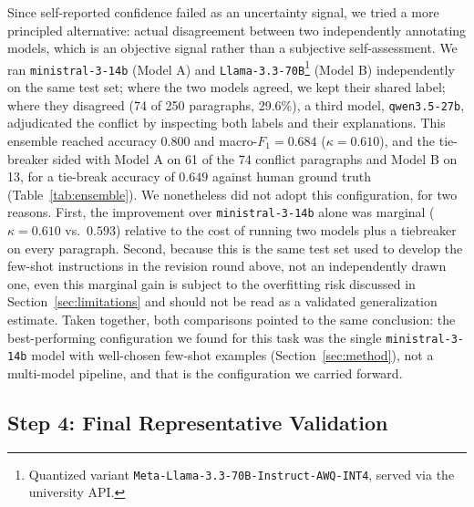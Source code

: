 \documentclass[a4paper,oneside,bibliography=totoc]{scrartcl}
\begin{document}
Since self-reported confidence failed as an uncertainty signal, we tried a more principled alternative: actual disagreement between two independently annotating models, which is an objective signal rather than a subjective self-assessment. We ran \texttt{ministral-3-14b} (Model A) and \texttt{Llama-3.3-70B}\footnote{Quantized variant \texttt{Meta-Llama-3.3-70B-Instruct-AWQ-INT4}, served via the university API.} (Model B) independently on the same test set; where the two models agreed, we kept their shared label; where they disagreed (74 of 250 paragraphs, 29.6\%), a third model, \texttt{qwen3.5-27b}, adjudicated the conflict by inspecting both labels and their explanations. This ensemble reached accuracy $0.800$ and macro-$F_1 = 0.684$ ($\kappa = 0.610$), and the tie-breaker sided with Model A on 61 of the 74 conflict paragraphs and Model B on 13, for a tie-break accuracy of $0.649$ against human ground truth (Table~\ref{tab:ensemble}). We nonetheless did not adopt this configuration, for two reasons. First, the improvement over \texttt{ministral-3-14b} alone was marginal ($\kappa = 0.610$ vs.\ $0.593$) relative to the cost of running two models plus a tiebreaker on every paragraph. Second, because this is the same test set used to develop the few-shot instructions in the revision round above, not an independently drawn one, even this marginal gain is subject to the overfitting risk discussed in Section~\ref{sec:limitations} and should not be read as a validated generalization estimate. Taken together, both comparisons pointed to the same conclusion: the best-performing configuration we found for this task was the single \texttt{ministral-3-14b} model with well-chosen few-shot examples (Section~\ref{sec:method}), not a multi-model pipeline, and that is the configuration we carried forward.

\subsection*{Step 4: Final Representative Validation}
\label{sec:method-final}
\end{document}
